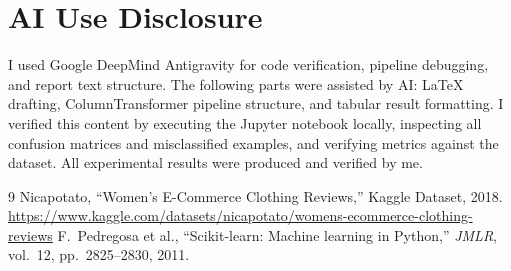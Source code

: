 \documentclass[conference,10pt,a4paper]{IEEEtran}
\begin{document}
\section*{AI Use Disclosure}
I used Google DeepMind Antigravity for code verification, pipeline debugging, and report text structure. The following parts were assisted by AI: LaTeX drafting, ColumnTransformer pipeline structure, and tabular result formatting. I verified this content by executing the Jupyter notebook locally, inspecting all confusion matrices and misclassified examples, and verifying metrics against the dataset. All experimental results were produced and verified by me.

\begin{thebibliography}{9}
 Nicapotato, ``Women's E-Commerce Clothing Reviews,'' Kaggle Dataset, 2018. \url{https://www.kaggle.com/datasets/nicapotato/womens-ecommerce-clothing-reviews}
 F.\ Pedregosa et al., ``Scikit-learn: Machine learning in Python,'' \emph{JMLR}, vol.\ 12, pp.\ 2825--2830, 2011.
\end{thebibliography}
\end{document}

